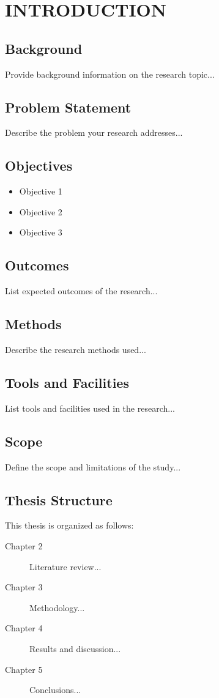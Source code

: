 
\chapter{INTRODUCTION}

\ifpdf
    \graphicspath{{1_introduction/figures/PNG}{1_introduction/figures/PDF}{1_introduction/figures}}
\else
    \graphicspath{{1_introduction/figures/EPS}{1_introduction/figures}}
\fi

\section{Background}
Provide background information on the research topic...

\section{Problem Statement}
Describe the problem your research addresses...

\section{Objectives}
\begin{itemize}
    \item Objective 1
    \item Objective 2
    \item Objective 3
\end{itemize}

\section{Outcomes}
List expected outcomes of the research...

\section{Methods}
Describe the research methods used...

\section{Tools and Facilities}
List tools and facilities used in the research...

\section{Scope}
Define the scope and limitations of the study...

\section{Thesis Structure}
This thesis is organized as follows:
\begin{description}
    \item[Chapter 2] Literature review...
    \item[Chapter 3] Methodology...
    \item[Chapter 4] Results and discussion...
    \item[Chapter 5] Conclusions...
\end{description}
